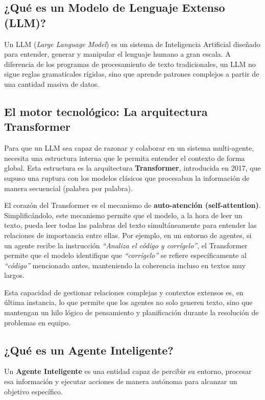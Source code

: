 \documentclass[12pt,a4paper]{article}
\begin{document}
\subsection{¿Qué es un Modelo de Lenguaje Extenso (LLM)?}
Un LLM (\textit{Large Language Model}) es un sistema de Inteligencia Artificial diseñado para entender, generar y manipular el lenguaje humano a gran escala. A diferencia de los programas de procesamiento de texto tradicionales, un LLM no sigue reglas gramaticales rígidas, sino que aprende patrones complejos a partir de una cantidad masiva de datos.

\subsection{El motor tecnológico: La arquitectura Transformer}

Para que un LLM sea capaz de razonar y colaborar en un sistema multi-agente, necesita una estructura interna que le permita entender el contexto de forma global. Esta estructura es la arquitectura \textbf{Transformer}, introducida en 2017, que supuso una ruptura con los modelos clásicos que procesaban la información de manera secuencial (palabra por palabra).

El corazón del Transformer es el mecanismo de \textbf{auto-atención (self-attention)}. Simplificándolo, este mecanismo permite que el modelo, a la hora de leer un texto, pueda leer todas las palabras del texto simultáneamente para entender las relaciones de importancia entre ellas. Por ejemplo, en un entorno de agentes, si un agente recibe la instrucción \textit{``Analiza el código y corrígelo''}, el Transformer permite que el modelo identifique que \textit{``corrígelo''} se refiere específicamente al \textit{``código''} mencionado antes, manteniendo la coherencia incluso en textos muy largos.

Esta capacidad de gestionar relaciones complejas y contextos extensos es, en última instancia, lo que permite que los agentes no solo generen texto, sino que mantengan un hilo lógico de pensamiento y planificación durante la resolución de problemas en equipo.

\subsection{¿Qué es un Agente Inteligente?}

Un \textbf{Agente Inteligente} es una entidad capaz de percibir su entorno, procesar esa información y ejecutar acciones de manera autónoma para alcanzar un objetivo específico. 
\end{document}
